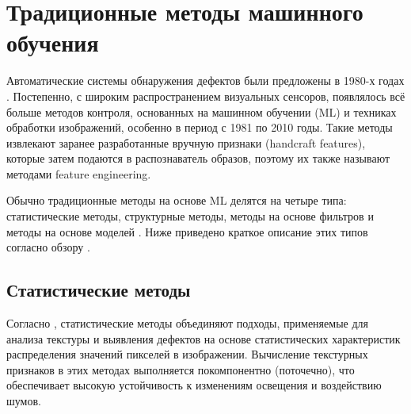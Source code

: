 \documentclass[14pt,a4paper]{article}
\begin{document}
\section{Традиционные методы машинного обучения}
Автоматические системы обнаружения дефектов были предложены в 1980-х годах \cite{Hutten2024}. Постепенно, с широким распространением визуальных сенсоров, появлялось всё больше методов контроля, основанных на машинном обучении (ML) и техниках обработки изображений, особенно в период с 1981 по 2010 годы. Такие методы извлекают заранее разработанные вручную признаки (handcraft features), которые затем подаются в распознаватель образов, поэтому их также называют методами feature engineering. 

Обычно традиционные методы на основе ML делятся на четыре типа: статистические методы, структурные методы, методы на основе фильтров и методы на основе моделей \cite{Hutten2024, Qifan2022}. Ниже приведено краткое описание этих типов согласно обзору \cite{Qifan2022}.

\subsection{Статистические методы}
Согласно \cite{Qifan2022}, статистические методы объединяют подходы, применяемые для анализа текстуры и выявления дефектов на основе статистических характеристик распределения значений пикселей в изображении. Вычисление текстурных признаков в этих методах выполняется покомпонентно (поточечно), что обеспечивает высокую устойчивость к изменениям освещения и воздействию шумов.
\end{document}
